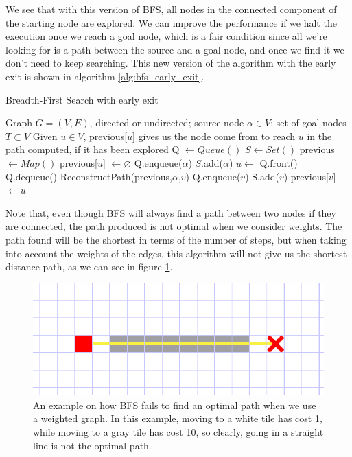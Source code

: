 \documentclass[a4paper,10pt]{report}
\begin{document}
We see that with this version of BFS, all nodes in the connected component of the starting node are explored. We can improve the performance if we halt the execution once we reach a goal node, which is a fair condition since all we're looking for is a path between the source and a goal node, and once we find it we don't need to keep searching. This new version of the algorithm with the early exit is shown in algorithm \ref{alg:bfs_early_exit}.

\begin{algorithm}
\caption{Breadth-First Search with early exit}
\label{alg:bfs_early_exit}
\begin{algorithmic}[1]
\Require Graph $G = (V, E)$, directed or undirected; source node $\alpha \in V$; set of goal nodes $T \subset V$
\Ensure Given $u \in V$, previous[$u$] gives us the node come from to reach $u$ in the path computed, if it has been explored
\State Q $\gets Queue()$
\State $S \gets Set()$
\State previous $\gets Map()$
	\State previous[$u$] $\gets \varnothing$
\EndFor
\State Q.enqueue($\alpha$)
\State $S$.add($\alpha$)
	\State $u \gets$ Q.front()
	\State Q.dequeue()
			 
				\State \Return ReconstructPath(previous,$\alpha$,$v$)
			\EndIf
			\State Q.enqueue($v$)
			\State S.add($v$)
			\State previous[$v$] $\gets u$
		\EndIf
	\EndFor
\EndWhile
\EndProcedure
\end{algorithmic}
\end{algorithm}

Note that, even though BFS will always find a path between two nodes if they are connected, the path produced is not optimal when we consider weights. The path found will be the shortest in terms of the number of steps, but when taking into account the weights of the edges, this algorithm will not give us the shortest distance path, as we can see in figure \ref{fig:bfs-fail}.

\begin{figure}
\centering
\includegraphics[width=1\linewidth]{bfs-fail}
\caption{An example on how BFS fails to find an optimal path when we use a weighted graph. In this example, moving to a white tile has cost 1, while moving to a gray tile has cost 10, so clearly, going in a straight line is not the optimal path.}
\label{fig:bfs-fail}
\end{figure}
\end{document}
